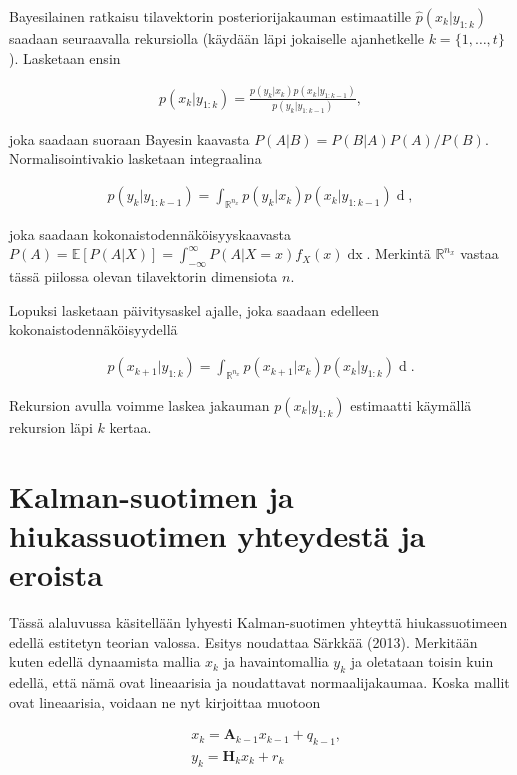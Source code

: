 \documentclass[
  12pt,
  a4paper, twoside]{book}
\begin{document}
Bayesilainen ratkaisu tilavektorin posteriorijakauman estimaatille \(\hat{p}(x_k|y_{1:k})\) saadaan seuraavalla rekursiolla (käydään läpi jokaiselle ajanhetkelle \(k=\{1,\ldots,t\}\)). Lasketaan ensin

\begin{align}\label{bayes-paivitys}
p(x_k|y_{1:k}) = \frac{p(y_k|x_k)p(x_k|y_{1:k-1})}{p(y_k|y_{1:k-1})},
\end{align}

\noindent joka saadaan suoraan Bayesin kaavasta \(P(A|B)=P(B|A)P(A)/P(B)\). Normalisointivakio lasketaan integraalina

\begin{align}\label{bayes-normalisointi}
p(y_k|y_{1:k-1})=\int_{\mathbb{R}^{n_x}}p(y_k|x_k)p(x_k|y_{1:k-1})\mathop{dx_k},
\end{align}

\noindent joka saadaan kokonaistodennäköisyyskaavasta \(P(A)=\mathbb{E}[P(A|X)]=\int_{-\infty}^{\infty}P(A|X=x)f_X(x)\mathop{dx}\). Merkintä \(\mathbb{R}^{n_x}\) vastaa tässä piilossa olevan tilavektorin dimensiota \(n\).

Lopuksi lasketaan päivitysaskel ajalle, joka saadaan edelleen kokonaistodennäköisyydellä

\begin{align}\label{bayes-aikapaivitys}
p(x_{k+1}|y_{1:k})=\int_{\mathbb{R}^{n_x}}p(x_{k+1}|x_k)p(x_k|y_{1:k})\mathop{dx_k}.
\end{align}

\noindent Rekursion avulla voimme laskea jakauman \(p(x_k|y_{1:k})\) estimaatti käymällä rekursion läpi \(k\) kertaa.

\section{Kalman-suotimen ja hiukassuotimen yhteydestä ja eroista} \label{kf-yhteydet-erot}

Tässä alaluvussa käsitellään lyhyesti Kalman-suotimen yhteyttä hiukassuotimeen edellä estitetyn teorian valossa. Esitys noudattaa Särkkää (2013). \citep{sarkka-2013} Merkitään kuten edellä dynaamista mallia \(x_k\) ja havaintomallia \(y_k\) ja oletataan toisin kuin edellä, että nämä ovat lineaarisia ja noudattavat normaalijakaumaa. Koska mallit ovat lineaarisia, voidaan ne nyt kirjoittaa muotoon

\begin{align}
&\label{kalman-malli1}x_k=\mathbf{A}_{k-1}x_{k-1}+q_{k-1},\\
&\label{kalman-malli2}y_k=\mathbf{H}_k x_k + r_k
\end{align}
\end{document}
